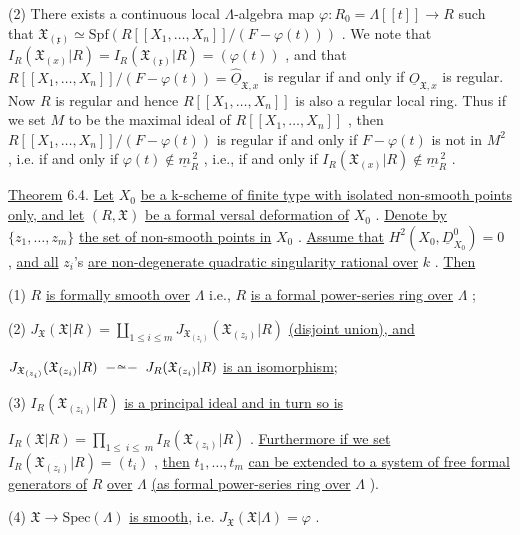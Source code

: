 (2)  There exists a continuous local $\Lambda$-algebra map $\varphi : R_0 = \Lambda[[t]] \to R$ such that $\mathfrak{X}_{(\mathfrak{x})} \simeq \mathrm{Spf}(R[[X_1,\ldots,X_n]]/(F - \varphi(t)))$ . We note that $I_R(\mathfrak{X}_{(x)}|R) = I_R(\mathfrak{X}_{(\mathfrak{x})}|R) = (\varphi(t))$ , and that $R[[X_1,\ldots,X_n]]/(F - \varphi(t)) = \hat{\underline{O}}_{\mathfrak{X},x}$ is regular if and only if $\underline{O}_{\mathfrak{X},x}$ is regular. Now $R$ is regular and hence $R[[X_1,\ldots,X_n]]$ is also a regular local ring. Thus if we set $M$ to be the maximal ideal of $R[[X_1,\ldots,X_n]]$ , then $R[[X_1,\ldots,X_n]]/(F - \varphi(t))$ is regular if and only if $F - \varphi(t)$ is not in $M^2$ , i.e. if and only if $\varphi(t) \notin \underline{m}_R^{\,2}$ , i.e., if and only if $I_R(\mathfrak{X}_{(x)}|R) \notin \underline{m}_R^{\,2}$ .

\underline{Theorem} 6.4.  \underline{Let} $X_0$ \underline{be a k-scheme of finite type with isolated non-smooth points only, and let} $(R, \mathfrak{X})$ \underline{be a formal versal deformation of} $X_0$ . \underline{Denote by} $\{z_1,\ldots,z_m\}$ \underline{the set of non-smooth points in} $X_0$ . \underline{Assume that} $H^2(X_0, \underline{D}^0_{X_0}) = 0$ , \underline{and all} $z_i$'s \underline{are non-degenerate quadratic singularity rational over} $k$ . \underline{Then}

(1)  $R$ \underline{is formally smooth over} $\Lambda$ i.e., $R$ \underline{is a formal power-series ring over} $\Lambda$ ;

(2)  $J_{\mathfrak{X}}(\mathfrak{X}|R) = \coprod_{1\leq i\leq m} J_{\mathfrak{X}_{(z_i)}}(\mathfrak{X}_{(z_i)}|R)$  \underline{(disjoint union), and}

$J_{\mathfrak{X}_{(z_i)}}(\mathfrak{X}_{(z_i)}|R) \;\overset{\sim}{\relbar\relbar\relbar}\; J_R(\mathfrak{X}_{(z_i)}|R)$  \underline{is an isomorphism};

(3)  $I_R(\mathfrak{X}_{(z_i)}|R)$ \underline{is a principal ideal and in turn so is}

$I_R(\mathfrak{X}|R) = \prod_{1\leq\ i\leq\ m} I_R(\mathfrak{X}_{(z_i)}|R)$ . \underline{Furthermore if we set} $I_R(\mathfrak{X}_{(z_i)}|R) = (t_i)$ , \underline{then} $t_1,\ldots,t_m$ \underline{can be extended to a system of free formal generators of} $R$ \underline{over} $\Lambda$ \underline{(as formal power-series ring over} $\Lambda$ ).

(4)  $\mathfrak{X} \to \mathrm{Spec}(\Lambda)$ \underline{is smooth}, i.e. $J_{\mathfrak{X}}(\mathfrak{X}|\Lambda) = \varphi$ .


